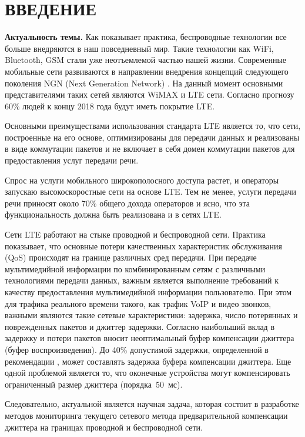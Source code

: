 \chapter*{ВВЕДЕНИЕ}							%

\textbf{Актуальность темы.} Как показывает практика, беспроводные технологии все больше внедряются в наш повседневный мир. Такие технологии как WiFi, Bluetooth, GSM стали уже неотъемлемой частью нашей жизни. 
Современные мобильные сети развиваются в направлении внедрения концепций следующего поколения NGN (Next Generation Network) \cite{zacon:net,zacon:tele}. На данный момент основными представителями таких сетей являются WiMAX и LTE сети.
Согласно прогнозу \cite{ericsson} 60\% людей к концу 2018 года будут иметь покрытие LTE.


Основными преимуществами использования стандарта LTE является то, что сети, построенные на его основе, оптимизированы для передачи данных и реализованы в виде коммутации пакетов 
и не включает в себя домен коммутации пакетов для предоставления услуг передачи речи.

Спрос на услуги мобильного широкополосного доступа растет, и операторы запускаю высокоскоростные сети на основе LTE. 
Тем не менее, услуги передачи речи приносят около 70\% общего дохода операторов и ясно, что эта функциональность должна быть реализована и в сетях LTE.

Сети LTE работают на стыке проводной и беспроводной сети. %
Практика показывает, что основные потери качественных характеристик обслуживания (QoS) происходят на границе различных сред передачи.
При передаче мультимедийной информации по комбинированным сетям с различными технологиями передачи данных, важным является выполнение требований к качеству предоставления мультимедийной информации пользователю.
При этом для трафика реального времени такого, как трафик VoIP и видео звонков, важными являются такие сетевые характеристики:
задержка, число потерянных и поврежденных пакетов и джиттер задержки.
Согласно \cite{rokovoy} наибольший вклад в задержку и потери пакетов вносит неоптимальный буфер компенсации джиттера (буфер воспроизведения). До 40\% допустимой задержки, определенной в рекомендации \cite{G114}, может составлять задержка буфера компенсации джиттера.
Еще одной проблемой является то, что оконечные устройства могут компенсировать ограниченный размер джиттера (порядка~50~мс).

Следовательно, актуальной является научная задача, которая состоит в разработке методов мониторинга текущего сетевого метода предварительной компенсации джиттера на границах проводной и беспроводной сети.


